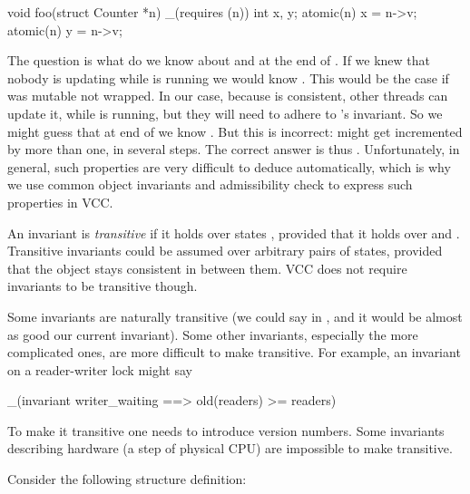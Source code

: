 \begin{VCC}
void foo(struct Counter *n)
  _(requires \wrapped(n))
{
  int x, y;
  atomic(n) { x = n->v; }
  atomic(n) { y = n->v; }
}
\end{VCC}

\noindent
The question is what do we know about  and 
at the end of .
If we knew that nobody is updating  while 
is running we would know .
This would be the case if  was mutable not wrapped.
In our case, because  is consistent, other threads can update it,
while  is running, but they will need to
adhere to 's invariant.
So we might guess that at end of  we know
.
But this is incorrect:  might get incremented
by more than one, in several steps.
The correct answer is thus .
Unfortunately, in general, such properties are very difficult to deduce
automatically, which is why we use common object invariants and admissibility
check to express such properties in VCC.

\begin{note}
An invariant is \emph{transitive} if it holds over states ,
provided that it holds over  and .
Transitive invariants could be assumed over arbitrary
pairs of states, provided that the object stays consistent
in between them. 
VCC does not require invariants to be transitive though.

Some invariants are naturally transitive (\eg we could say
 in ,
and it would be almost as good our current invariant).
Some other invariants, especially the more complicated ones,
are more difficult to make transitive.
For example, an invariant on a reader-writer lock might say
\begin{VCC}
_(invariant writer_waiting ==> old(readers) >= readers)
\end{VCC}
\noindent
To make it transitive one needs to introduce version numbers.
Some invariants describing hardware (\eg a step of physical CPU)
are impossible to make transitive.
\end{note}

Consider the following structure definition:


